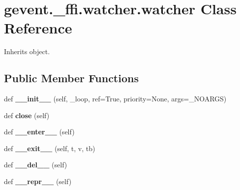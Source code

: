 \hypertarget{classgevent_1_1__ffi_1_1watcher_1_1watcher}{}\section{gevent.\+\_\+ffi.\+watcher.\+watcher Class Reference}
\label{classgevent_1_1__ffi_1_1watcher_1_1watcher}


Inherits object.

\subsection*{Public Member Functions}
\begin{DoxyCompactItemize}
\item 
\mbox{\label{classgevent_1_1__ffi_1_1watcher_1_1watcher_aed34bee816ddbb80a3296c766e7a6af2}} 
def {\bfseries \+\_\+\+\_\+init\+\_\+\+\_\+} (self, \+\_\+loop, ref=True, priority=None, args=\+\_\+\+N\+O\+A\+R\+GS)
\item 
\mbox{\label{classgevent_1_1__ffi_1_1watcher_1_1watcher_a0b45cd5ab7d5f42a13d5891ff231254b}} 
def {\bfseries close} (self)
\item 
\mbox{\label{classgevent_1_1__ffi_1_1watcher_1_1watcher_aaedd6298bf5e0ac982943f70fc46e1a4}} 
def {\bfseries \+\_\+\+\_\+enter\+\_\+\+\_\+} (self)
\item 
\mbox{\label{classgevent_1_1__ffi_1_1watcher_1_1watcher_aab71bd87e4288b008eb750180ec0fd59}} 
def {\bfseries \+\_\+\+\_\+exit\+\_\+\+\_\+} (self, t, v, tb)
\item 
\mbox{\label{classgevent_1_1__ffi_1_1watcher_1_1watcher_ae0d654592e8bbebcda03274ab875b87a}} 
def {\bfseries \+\_\+\+\_\+del\+\_\+\+\_\+} (self)
\item 
\mbox{\label{classgevent_1_1__ffi_1_1watcher_1_1watcher_a18223bc147d8650982e4e2624c6c183c}} 
def {\bfseries \+\_\+\+\_\+repr\+\_\+\+\_\+} (self)
\item 
\mbox{\label{classgevent_1_1__ffi_1_1watcher_1_1watcher_a8a6f883ced43f14d28f0bf0a478309ad}} 

\end{DoxyCompactItemize}
